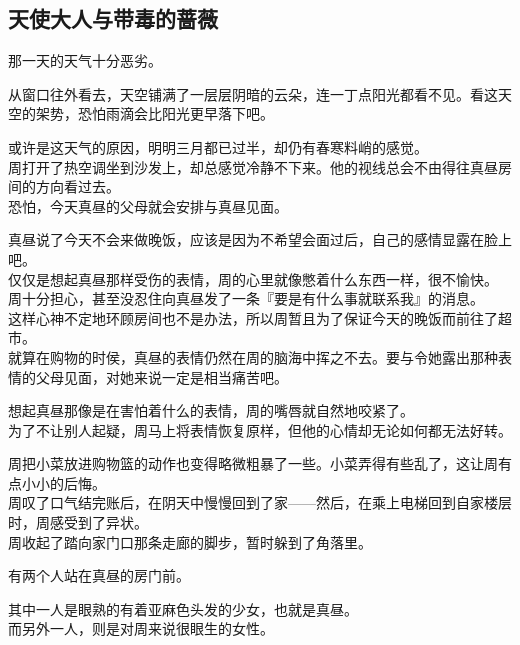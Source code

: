 \subsection{天使大人与带毒的蔷薇}

那一天的天气十分恶劣。

从窗口往外看去，天空铺满了一层层阴暗的云朵，连一丁点阳光都看不见。看这天空的架势，恐怕雨滴会比阳光更早落下吧。

或许是这天气的原因，明明三月都已过半，却仍有春寒料峭的感觉。\\

周打开了热空调坐到沙发上，却总感觉冷静不下来。他的视线总会不由得往真昼房间的方向看过去。\\

恐怕，今天真昼的父母就会安排与真昼见面。

真昼说了今天不会来做晚饭，应该是因为不希望会面过后，自己的感情显露在脸上吧。\\

仅仅是想起真昼那样受伤的表情，周的心里就像憋着什么东西一样，很不愉快。\\

周十分担心，甚至没忍住向真昼发了一条『要是有什么事就联系我』的消息。\\

这样心神不定地环顾房间也不是办法，所以周暂且为了保证今天的晚饭而前往了超市。\\

就算在购物的时侯，真昼的表情仍然在周的脑海中挥之不去。要与令她露出那种表情的父母见面，对她来说一定是相当痛苦吧。

想起真昼那像是在害怕着什么的表情，周的嘴唇就自然地咬紧了。\\

为了不让别人起疑，周马上将表情恢复原样，但他的心情却无论如何都无法好转。

周把小菜放进购物篮的动作也变得略微粗暴了一些。小菜弄得有些乱了，这让周有点小小的后悔。\\

周叹了口气结完账后，在阴天中慢慢回到了家——然后，在乘上电梯回到自家楼层时，周感受到了异状。\\

周收起了踏向家门口那条走廊的脚步，暂时躲到了角落里。

有两个人站在真昼的房门前。

其中一人是眼熟的有着亚麻色头发的少女，也就是真昼。\\

而另外一人，则是对周来说很眼生的女性。

